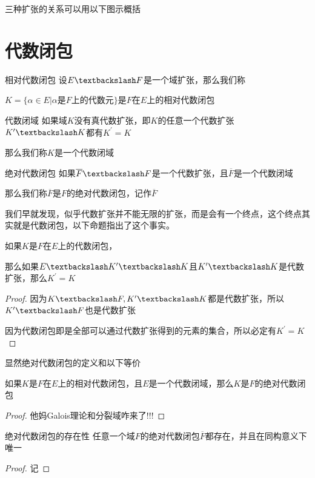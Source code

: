 \documentclass[12pt, a4paper, oneside, UTF8]{ctexbook}
\begin{document}
		三种扩张的关系可以用以下图示概括
	\section{代数闭包}
		\begin{defn}{相对代数闭包}{}
				设$E \textbackslash F$是一个域扩张，那么我们称
				
				$K  = \{\alpha \in E | \alpha \text{是}F\text{上的代数元}\}$是$F$在$E$上的相对代数闭包
		\end{defn}
		\begin{defn}{代数闭域}{}
			如果域$K$没有真代数扩张，即$K$的任意一个代数扩张$K^{\prime} \textbackslash K$都有$K^{\prime}=K$

			那么我们称$K$是一个代数闭域
		\end{defn}
		\begin{defn}{绝对代数闭包}{}
			如果$\overline{F} \textbackslash F$是一个代数扩张，且$\overline{F}$是一个代数闭域
			
			那么我们称$\overline{F}$是$F$的绝对代数闭包，记作$\overline{F}$
		\end{defn}

		我们早就发现，似乎代数扩张并不能无限的扩张，而是会有一个终点，这个终点其实就是代数闭包，以下命题指出了这个事实。

		\begin{proposition}
			如果$K$是$F$在$E$上的代数闭包，
			
			那么如果$E \textbackslash K^{\prime} \textbackslash K$且$K^{\prime} \textbackslash K$是代数扩张，那么$K^{\prime}=K$
		\end{proposition}
		\begin{proof}
			因为$K \textbackslash F,K^{\prime} \textbackslash K$都是代数扩张，所以$K^{\prime} \textbackslash F$也是代数扩张

			因为代数闭包即是全部可以通过代数扩张得到的元素的集合，所以必定有$K^{\prime} = K$
		\end{proof}
		显然绝对代数闭包的定义和以下等价
		\begin{proposition}
			如果$K$是$F$在$E$上的相对代数闭包，且$E$是一个代数闭域，那么$K$是$F$的绝对代数闭包
		\end{proposition}
		\begin{proof}
			他妈Galois理论和分裂域咋来了!!!
		\end{proof}
		\begin{them}{绝对代数闭包的存在性}{}
			任意一个域$F$的绝对代数闭包$\overline{F}$都存在，并且在同构意义下唯一
		\end{them}
		\begin{proof}
			记
		\end{proof}
\ifx\allfiles\undefined
\end{document}
